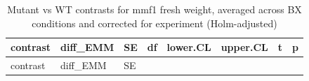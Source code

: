 \documentclass[
  10pt,
]{article}
\begin{document}
\begin{longtable}[]{@{}
  >{\raggedright\arraybackslash}p{}
  >{\raggedleft\arraybackslash}p{}
  >{\raggedleft\arraybackslash}p{}
  >{\raggedleft\arraybackslash}p{}
  >{\raggedleft\arraybackslash}p{}
  >{\raggedleft\arraybackslash}p{}
  >{\raggedleft\arraybackslash}p{}
  >{\raggedleft\arraybackslash}p{}@{}}
\caption{Mutant vs WT contrasts for mmf1 fresh weight, averaged across
BX conditions and corrected for experiment
(Holm-adjusted)}\tabularnewline
\toprule\noalign{}
\begin{minipage}[b]{\linewidth}\raggedright
contrast
\end{minipage} & \begin{minipage}[b]{\linewidth}\raggedleft
diff\_EMM
\end{minipage} & \begin{minipage}[b]{\linewidth}\raggedleft
SE
\end{minipage} & \begin{minipage}[b]{\linewidth}\raggedleft
df
\end{minipage} & \begin{minipage}[b]{\linewidth}\raggedleft
lower.CL
\end{minipage} & \begin{minipage}[b]{\linewidth}\raggedleft
upper.CL
\end{minipage} & \begin{minipage}[b]{\linewidth}\raggedleft
t
\end{minipage} & \begin{minipage}[b]{\linewidth}\raggedleft
p
\end{minipage} \\
\midrule\noalign{}
\endfirsthead
\toprule\noalign{}
\begin{minipage}[b]{\linewidth}\raggedright
contrast
\end{minipage} & \begin{minipage}[b]{\linewidth}\raggedleft
diff\_EMM
\end{minipage} & \begin{minipage}[b]{\linewidth}\raggedleft
SE
\end{minipage} & \begin{minipage}[b]{\linewidth}\raggedleft

\end{minipage}
\end{longtable}
\end{document}

